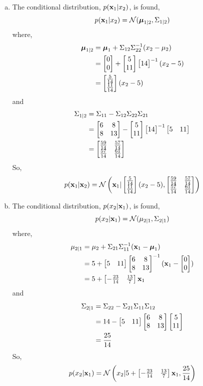 \documentclass[12pt,letterpaper,fleqn]{hmcpset}
\begin{document}
\begin{solution}
\begin{enumerate}[(a)]
        \item
            The conditional distribution, $p({\bf x}_1 | x_2)$, is found,
            $$
                p({\bf x}_1 | x_2) = {\cal N}(\hbox{\boldmath$\mu$}_{1|2}, \Sigma_{1|2})\\
            $$
            where,
            \begin{align*}
                \hbox{\boldmath$\mu$}_{1|2} &= \hbox{\boldmath$\mu$}_1 + \Sigma_{12} \Sigma_{22}^{-1}(x_2 - \mu_2) \\
                 &= \begin{bmatrix} 0\\0 \end{bmatrix} + \begin{bmatrix} 5\\11 \end{bmatrix} \begin{bmatrix} 14 \end{bmatrix}^{-1} (x_2 - 5)\\
                 &= \begin{bmatrix} \frac{5}{14}\\\frac{11}{14} \end{bmatrix}(x_2 - 5)
            \end{align*}
            and
            \begin{align*}
                \Sigma_{1|2} &= \Sigma_{11} - \Sigma_{12}\Sigma_{22}\Sigma_{21}\\
                &= \begin{bmatrix} 6 & 8\\ 8 & 13 \end{bmatrix} - \begin{bmatrix} 5\\11 \end{bmatrix} \begin{bmatrix} 14 \end{bmatrix}^{-1} \begin{bmatrix} 5 & 11 \end{bmatrix}\\
                &= \begin{bmatrix} \frac{59}{14} & \frac{57}{14} \\ \frac{57}{14} & \frac{61}{14}  \end{bmatrix}\\
            \end{align*}
            So,
            $$  p({\bf x}_1 | {\bf x}_2) = {\cal N} \left({\bf x}_1 | \begin{bmatrix} \frac{5}{14}\\\frac{11}{14} \end{bmatrix}(x_2 - 5), \begin{bmatrix} \frac{59}{14} & \frac{57}{14} \\ \frac{57}{14} & \frac{61}{14}  \end{bmatrix} \right) $$
        \item
            The conditional distribution, $p(x_2 | {\bf x}_1)$, is found,
            $$
                p(x_2 | {\bf x}_1) = {\cal N}(\mu_{2|1}, \Sigma_{2|1})\\
            $$
            where,
            \begin{align*}
                \mu_{2|1} &= \mu_2 + \Sigma_{21} \Sigma_{11}^{-1}({\bf x}_1 - \hbox{\boldmath$\mu$}_1) \\
                &= 5 + \begin{bmatrix} 5 & 11 \end{bmatrix} \begin{bmatrix} 6 & 8\\ 8 & 13 \end{bmatrix}^{-1} ({\bf x}_1 - \begin{bmatrix} 0\\0 \end{bmatrix})\\
                &= 5 + \begin{bmatrix} -\frac{23}{14} & \frac{13}{7} \end{bmatrix}{\bf x}_1
            \end{align*}
            and
            \begin{align*}
                \Sigma_{2|1} &= \Sigma_{22} - \Sigma_{21}\Sigma_{11}\Sigma_{12}\\
                &= 14 - \begin{bmatrix} 5 & 11 \end{bmatrix} \begin{bmatrix} 6 & 8\\ 8 & 13 \end{bmatrix} \begin{bmatrix} 5 \\ 11 \end{bmatrix} \\
                &= \frac{25}{14}              
            \end{align*}
            So, 
            $$ p(x_2 | {\bf x}_1) = {\cal N} \left( x_2 | 5 + \begin{bmatrix} -\frac{23}{14} & \frac{13}{7} \end{bmatrix}{\bf x}_1, \frac{25}{14} \right) $$
    \end{enumerate}
\end{solution}
\end{document}
